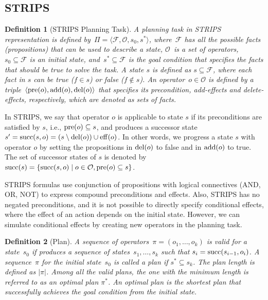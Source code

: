 \documentclass[ppgc,diss,english]{iiufrgs}
\newtheorem{definition}{Definition}
\begin{document}
\subsection{STRIPS}
\label{sec:background-strips}

\begin{definition}[STRIPS Planning Task]\label{def:strips}
A planning task in STRIPS representation is defined by~$\Pi=\langle\mathcal{F},\mathcal{O},s_{0},s^{*}\rangle$, where~$\mathcal{F}$ has all the possible facts (propositions) that can be used to describe a state, $\mathcal{O}$~is a set of operators,~$s_{0} \subseteq \mathcal{F}$ is an initial state, and~$s^{*} \subseteq \mathcal{F}$ is the goal condition that specifies the facts that should be true to solve the task.
A state $s$ is defined as $s \subseteq \mathcal{F}$, where each fact in $s$ can be true ($f \in s$) or false ($f \notin s$). %
An operator~$o \in \mathcal{O}$ is defined by a triple~$\langle\operatorname{pre}(o),\operatorname{add}(o),\operatorname{del}(o)\rangle$ that specifies its precondition, add-effects and delete-effects, respectively, which are denoted as sets of facts.
\end{definition}

In STRIPS, we say that operator $o$ is applicable to state $s$ if its preconditions are satisfied by $s$, i.e., $\operatorname{pre}(o) \subseteq s$, and produces a successor state~$s' = \operatorname{succ}(s,o) = (s \setminus \operatorname{del}(o)) \cup \operatorname{eff}(o)$. In other words, we progress a state $s$ with operator $o$ by setting the propositions in $\operatorname{del}(o)$ to false and in $\operatorname{add}(o)$ to true. The set of successor states of $s$ is denoted by~$\operatorname{succ}(s)=\{\operatorname{succ}(s,o)\mid o\in \mathcal{O}, \operatorname{pre}(o) \subseteq s\}$.

STRIPS formulas use conjunction of propositions with logical connectives (AND, OR, NOT) to express compound preconditions and effects. Also, STRIPS has no negated preconditions, and it is not possible to directly specify conditional effects, where the effect of an action depends on the initial state. However, we can simulate conditional effects by creating new operators in the planning task.

\begin{definition}[Plan]\label{def:plan}
A sequence of operators~$\pi=(o_1,\ldots,o_k)$ is valid for a state~$s_0$ if produces a sequence of states~$s_1,\ldots,s_k$ such that $s_i=\operatorname{succ}(s_{i-1},o_i)$. A sequence~$\pi$ for the initial state~$s_{0}$ is called a plan if $s^{*} \subseteq s_{k}$. The plan length is defined as $|\pi|$. Among all the valid plans, the one with the minimum length is referred to as an optimal plan $\pi^{*}$. An optimal plan is the shortest plan that successfully achieves the goal condition from the initial state.
\end{definition}
\end{document}

